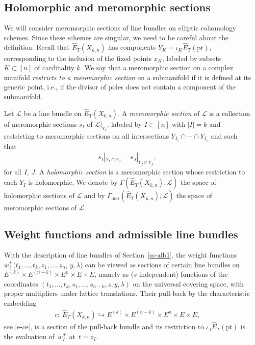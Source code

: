 \documentclass[10pt,a4paper]{amsart}
\numberwithin{equation}{section}
\begin{document}
\subsection{Holomorphic and meromorphic sections}\label{ss-ms}
We will consider meromorphic sections of line bundles on elliptic cohomology schemes. Since these schemes are singular, we need to be careful about the definition. Recall that $\hat E_T(X_{k,n})$ has components $Y_K=\iota_K\hat E_T(\mathrm{pt})$, corresponding to the inclusion of the fixed points $x_K$, labeled by subsets $K\subset[n]$ of cardinality $k$. We say that a meromorphic section on a complex manifold {\em restricts to a meromorphic section} on a submanifold if it is defined at its generic point, i.e., if the divisor of poles does not contain a component of the submanifold.
\begin{Definition}\label{def-mero} Let $\mathcal L$ be a line bundle on $\hat E_T(X_{k,n})$. A {\em meromorphic section} of $\mathcal L$ is a collection of meromorphic sections $s_I$ of $\mathcal L|_{Y_I}$, labeled by $I\subset[n]$ with $|I|=k$ and restricting to meromorphic sections on all intersections $Y_{I_1}\cap\cdots\cap Y_{I_s}$ and such that
 \begin{gather*}
 s_I|_{Y_I\cap Y_J}=s_J|_{Y_I\cap Y_J},
 \end{gather*}
for all $I$, $J$. A {\em holomorphic section} is a meromorphic section whose restriction to each $Y_I$ is holomorphic. We denote by $\Gamma(\hat E_T(X_{k,n}),\mathcal L)$ the space of holomorphic sections of $\mathcal L$ and by $\Gamma_{\mathrm{mer}}(\hat E_T(X_{k,n}),\mathcal L)$ the space of meromorphic sections of $\mathcal L$.
\end{Definition}

\subsection{Weight functions and admissible line bundles}
With the description of line bundles of Section~\ref{ss-alb1}, the weight functions $w^+_I(t_1,\dots,t_k,z_1,\dots,z_n$, $y,\lambda)$ can be viewed as sections of certain line bundles on $E^{(k)}\times E^{(n-k)}\times E^n\times E\times E$, namely as ($s$-independent) functions of the coordinates $(t_1,\dots,t_k,s_1,\dots,s_{n-k},z,y,\lambda)$ on the universal covering space, with proper multipliers under lattice translations. Their pull-back by the characteristic embedding
\begin{gather*}
 c \colon \ \hat E_T(X_{k,n})\hookrightarrow E^{(k)}\times E^{(n-k)}\times E^n\times E\times E,
\end{gather*}
see \eqref{e-ce}, is a section of the pull-back bundle and its restriction to $\iota_J\hat E_T(\mathrm{pt})$ is the evaluation of~$w^+_I$ at~$t=z_I$.
\end{document}

